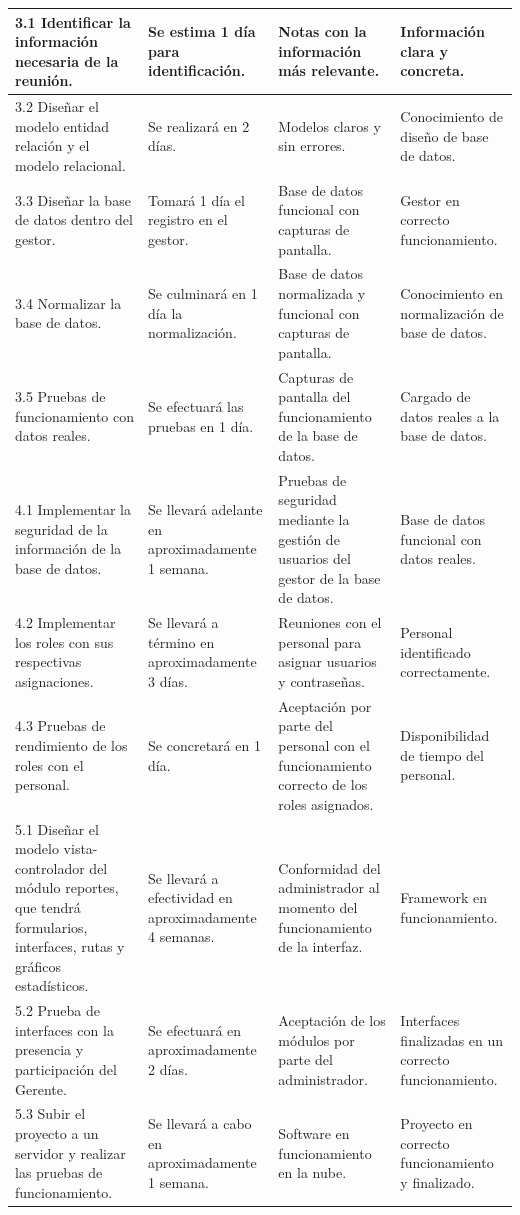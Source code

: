 \documentclass[12pt,letterpaper]{article}
\begin{document}
\begin{spacing}{1.1}
\begin{longtable}{| m{5.3cm} | m{2.9cm} | m{3.4cm} | m{3.4cm} | }
		3.1 Identificar la información necesaria de la reunión. & Se estima 1 día para identificación. & Notas con la información más relevante. & Información clara y concreta.\\
		\hline
		3.2 Diseñar el modelo entidad relación y el modelo relacional. & Se realizará en 2 días. & Modelos claros y sin errores. & Conocimiento de diseño de base de datos.\\
		\hline
		3.3 Diseñar la base de datos dentro del gestor. & Tomará 1 día el registro en el gestor. & Base de datos funcional con capturas de pantalla. & Gestor en correcto funcionamiento.\\
		\hline
		3.4 Normalizar la base de datos. & Se culminará en 1 día la normalización. & Base de datos normalizada y funcional con capturas de pantalla. & Conocimiento en normalización de base de datos.\\
		\hline
		3.5 Pruebas de funcionamiento con datos reales. & Se efectuará las pruebas en 1 día. & Capturas de pantalla del funcionamiento de la base de datos. & Cargado de datos reales a la base de datos.\\
		\hline
		
		4.1 Implementar la seguridad de la información de la base de datos. & Se llevará adelante en aproximadamente 1 semana. & Pruebas de seguridad mediante la gestión de usuarios del gestor de la base de datos. & Base de datos funcional con datos reales.\\
		\hline
		4.2 Implementar los roles con sus respectivas asignaciones. & Se llevará a término en aproximadamente 3 días. & Reuniones con el personal para asignar usuarios y contraseñas. & Personal identificado correctamente.\\
		\hline
		4.3 Pruebas de rendimiento de los roles con el personal. & Se concretará en 1 día. & Aceptación por parte del personal con el funcionamiento correcto de los roles asignados. & Disponibilidad de tiempo del personal.\\
		\hline
		
		5.1 Diseñar el modelo vista-controlador del módulo reportes, que tendrá formularios, interfaces, rutas y gráficos estadísticos. & Se llevará a efectividad en aproximadamente 4 semanas. & Conformidad del administrador al momento del funcionamiento de la interfaz. & Framework en funcionamiento.\\
		\hline
		5.2 Prueba de interfaces con la presencia y participación del Gerente. & Se efectuará en aproximadamente 2 días. & Aceptación de los módulos por parte del administrador. & Interfaces finalizadas en un correcto funcionamiento. \\
		\hline
		5.3 Subir el proyecto a un servidor y realizar las pruebas de funcionamiento. & Se llevará a cabo en aproximadamente 1 semana. & Software en funcionamiento en la nube. & Proyecto en correcto funcionamiento y finalizado. \\
		\hline		
	\end{longtable} 
\end{spacing}
\normalsize
\end{document}
